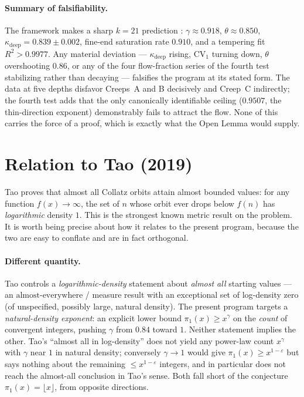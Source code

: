 \documentclass[11pt]{article}
\theoremstyle{definition}
\theoremstyle{remark}
\newcommand{\CV}{\mathrm{CV}}
\newcommand{\gam}{\gamma}
\newcommand{\kap}{\kappa}
\begin{document}
\paragraph{Summary of falsifiability.}
The framework makes a sharp $k = 21$ prediction \cite{Temp26,Drift26}:
$\gam \approx 0.918$, $\theta \approx 0.850$, $\kap_{\mathrm{deep}} = 0.839 \pm
0.002$, fine-end saturation rate $0.910$, and a tempering fit
$R^2 > 0.9977$. Any material deviation --- $\kap_{\mathrm{deep}}$ rising,
$\CV_1$ turning down, $\theta$ overshooting $0.86$, or any of the four
flow-fraction series of the fourth test stabilizing rather than decaying ---
falsifies the program at its stated form. The data at five depths disfavor
Creeps~A and B decisively and Creep~C indirectly; the fourth test adds that
the only canonically identifiable ceiling ($0.9507$, the thin-direction
exponent) demonstrably fails to attract the flow. None of this carries the
force of a proof, which is exactly what the Open Lemma would supply.

\section{Relation to Tao (2019)}
\label{sec:tao}

Tao \cite{Tao19} proves that almost all Collatz orbits attain almost bounded
values: for any function $f(x) \to \infty$, the set of $n$ whose orbit ever
drops below $f(n)$ has \emph{logarithmic} density $1$. This is the strongest
known metric result on the problem. It is worth being precise about how it
relates to the present program, because the two are easy to conflate and are in
fact orthogonal.

\paragraph{Different quantity.}
Tao controls a \emph{logarithmic-density} statement about \emph{almost all}
starting values --- an $\text{almost-everywhere}$ / measure result with an
exceptional set of log-density zero (of unspecified, possibly large, natural
density). The present program targets a \emph{natural-density exponent}: an
explicit lower bound $\pi_1(x) \geq x^{\gam}$ on the \emph{count} of convergent
integers, pushing $\gam$ from $0.84$ toward $1$. Neither statement implies the
other. Tao's ``almost all in log-density'' does not yield any power-law count
$x^{\gam}$ with $\gam$ near $1$ in natural density; conversely $\gam \to 1$
would give $\pi_1(x) \geq x^{1-\varepsilon}$ but says nothing about the
remaining $\leq x^{1-\varepsilon}$ integers, and in particular does not reach
the almost-all conclusion in Tao's sense. Both fall short of the conjecture
$\pi_1(x) = \lfloor x \rfloor$, from opposite directions.
\end{document}
